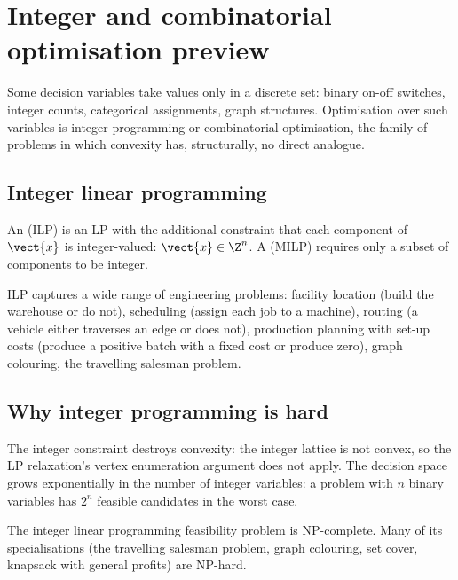 \section{Integer and combinatorial optimisation preview}

Some decision variables take values only in a discrete set:
binary on-off switches, integer counts, categorical assignments,
graph structures. Optimisation over such variables is integer
programming or combinatorial optimisation, the family of problems
in which convexity has, structurally, no direct analogue.

\subsection{Integer linear programming}

\begin{definition}
An  (ILP) is an LP with the
additional constraint that each component of $\vect{x}$ is
integer-valued: $\vect{x} \in \Z^{n}$. A  (MILP) requires only a subset of components to be
integer.
\end{definition}

ILP captures a wide range of engineering problems: facility
location (build the warehouse or do not), scheduling (assign each
job to a machine), routing (a vehicle either traverses an edge or
does not), production planning with set-up costs (produce a
positive batch with a fixed cost or produce zero), graph
colouring, the travelling salesman problem.

\subsection{Why integer programming is hard}

The integer constraint destroys convexity: the integer lattice is
not convex, so the LP relaxation's vertex enumeration argument
does not apply. The decision space grows exponentially in the
number of integer variables: a problem with $n$ binary variables
has $2^{n}$ feasible candidates in the worst case.

\begin{theorem}
The integer linear programming feasibility problem is NP-complete.
Many of its specialisations (the travelling salesman problem,
graph colouring, set cover, knapsack with general profits) are
NP-hard.
\end{theorem}

